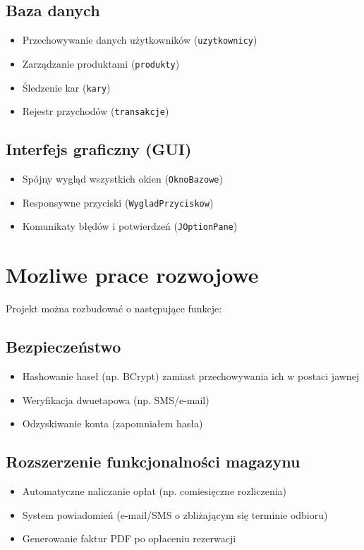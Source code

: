 \subsection{Baza danych}
\label{subsec:Baza danych}
\begin{itemize}
\item Przechowywanie danych użytkowników (\texttt{uzytkownicy})
\item Zarządzanie produktami (\texttt{produkty})
\item Śledzenie kar (\texttt{kary})
\item Rejestr przychodów (\texttt{transakcje})
\end{itemize}

\subsection{Interfejs graficzny (GUI)}
\label{subsec:Interfejs graficzny (GUI)}
\begin{itemize}
\item Spójny wygląd wszystkich okien (\texttt{OknoBazowe})
\item Responsywne przyciski (\texttt{WygladPrzyciskow})
\item Komunikaty błędów i potwierdzeń (\texttt{JOptionPane})
\end{itemize}

\section{Mozliwe prace rozwojowe}
\label{sec:Mozliwe prace rozwojowe}
Projekt można rozbudować o następujące funkcje:

\subsection{Bezpieczeństwo}
\label{subsec:Bezpieczeństwo}
\begin{itemize}
\item Hashowanie haseł (np. BCrypt) zamiast przechowywania ich w postaci jawnej
\item Weryfikacja dwuetapowa (np. SMS/e-mail)
\item Odzyskiwanie konta (zapomniałem hasła)
\end{itemize}

\subsection{Rozszerzenie funkcjonalności magazynu}
\label{subsec:Rozszerzenie funkcjonalności magazynu}
\begin{itemize}
\item Automatyczne naliczanie opłat (np. comiesięczne rozliczenia)
\item System powiadomień (e-mail/SMS o zbliżającym się terminie odbioru)
\item Generowanie faktur PDF po opłaceniu rezerwacji
\end{itemize}

